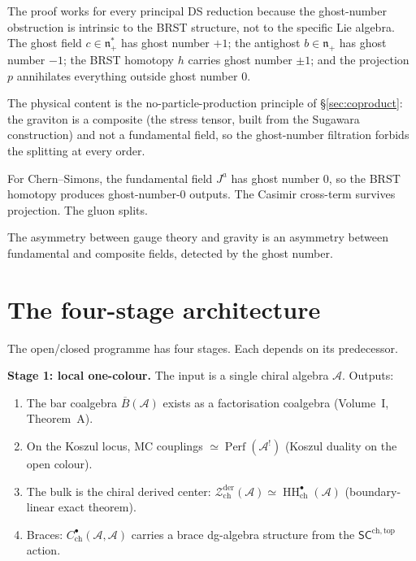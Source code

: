 \documentclass[11pt]{article}
\newcommand{\cA}{\mathcal{A}}
\newcommand{\cZ}{\mathcal{Z}}
\newcommand{\fn}{\mathfrak{n}}
\newcommand{\barB}{\overline{B}}
\newcommand{\SCchtop}{\mathsf{SC}^{\mathrm{ch,top}}}
\newcommand{\HH}{\operatorname{HH}}
\newcommand{\Perf}{\operatorname{Perf}}
\newcommand{\Zder}{\cZ^{\mathrm{der}}_{\mathrm{ch}}}
\begin{document}
The proof works for every principal DS reduction because the
ghost-number obstruction is intrinsic to the BRST structure, not
to the specific Lie algebra.  The ghost field $c \in \fn_+^*$
has ghost number $+1$; the antighost $b \in \fn_+$ has ghost
number $-1$; the BRST homotopy $h$ carries ghost number $\pm 1$;
and the projection $p$ annihilates everything outside ghost
number $0$.

The physical content is the no-particle-production principle of
\S\ref{sec:coproduct}: the graviton is a composite (the stress
tensor, built from the Sugawara construction) and not a fundamental
field, so the ghost-number filtration forbids the splitting at
every order.

For Chern--Simons, the fundamental field $J^a$ has ghost number
$0$, so the BRST homotopy produces ghost-number-$0$ outputs.
The Casimir cross-term survives projection.  The gluon splits.

The asymmetry between gauge theory and gravity is an asymmetry
between fundamental and composite fields, detected by the ghost
number.


\section{The four-stage architecture}
\label{sec:four-stages}

The open/closed programme has four stages.  Each depends on its
predecessor.

\medskip

\noindent
\textbf{Stage 1: local one-colour.}
The input is a single chiral algebra $\cA$.  Outputs:

\begin{enumerate}[label=\textup{(\alph*)},nosep]
\item The bar coalgebra $\barB(\cA)$ exists as a factorisation
  coalgebra (Volume~I, Theorem~A).
\item On the Koszul locus, MC couplings
  $\simeq \Perf(\cA^!)$ (Koszul duality on the open colour).
\item The bulk is the chiral derived center:
  $\Zder(\cA) \simeq \HH^\bullet_{\mathrm{ch}}(\cA)$
  (boundary-linear exact theorem).
\item Braces: $C^\bullet_{\mathrm{ch}}(\cA, \cA)$ carries a brace
  dg-algebra structure from the $\SCchtop$ action.
\end{enumerate}
\end{document}
